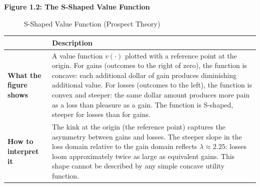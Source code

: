\documentclass[12pt, letterpaper]{article}
\begin{document}
\newpage
\textbf{Figure 1.2: The S-Shaped Value Function}

\begin{figure}[h]
\centering
{}
\caption{S-Shaped Value Function (Prospect Theory)}
\end{figure}


\begin{table}[H]
\centering
\small
\begin{tabularx}{\linewidth}{lY}
\toprule
 & Description \\
\midrule
\textbf{What the figure shows} & A value function $v(\cdot)$ plotted with a reference point at the origin. For gains (outcomes to the right of zero), the function is concave: each additional dollar of gain produces diminishing additional value. For losses (outcomes to the left), the function is convex and steeper: the same dollar amount produces more pain as a loss than pleasure as a gain. The function is S-shaped, steeper for losses than for gains. \\
\textbf{How to interpret it} & The kink at the origin (the reference point) captures the asymmetry between gains and losses. The steeper slope in the loss domain relative to the gain domain reflects $\lambda \approx 2.25$: losses loom approximately twice as large as equivalent gains. This shape cannot be described by any simple concave utility function. \\
\bottomrule
\end{tabularx}
\end{table}
\end{document}
